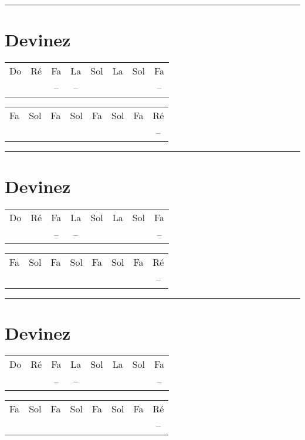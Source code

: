 \documentclass[12pt,a4paper]{article}
\begin{document}
\thispagestyle{empty}

\hrule{}

\section*{Devinez}

\begin{center}
\begin{tabular}{|cccccccc|}
\hline
Do 		& Ré 		& Fa 		& La 		& Sol		& La 		& Sol		& Fa 		\\
\cdot	& \cdot	& --			& --			& \cdot	& \cdot	& \cdot	& --	\\
\hline
\end{tabular}
\begin{tabular}{|cccccccc|}
\hline
Fa 		& Sol 		& Fa 		& Sol 		& Fa		& Sol 		& Fa		& Ré 		\\
\cdot	& \cdot	& \cdot	& \cdot	& \cdot	& \cdot	& \cdot	& --	\\
\hline
\end{tabular}
\end{center}

\hrule{}

\section*{Devinez}

\begin{center}
\begin{tabular}{|cccccccc|}
\hline
Do 		& Ré 		& Fa 		& La 		& Sol		& La 		& Sol		& Fa 		\\
\cdot	& \cdot	& --			& --			& \cdot	& \cdot	& \cdot	& --	\\
\hline
\end{tabular}
\begin{tabular}{|cccccccc|}
\hline
Fa 		& Sol 		& Fa 		& Sol 		& Fa		& Sol 		& Fa		& Ré 		\\
\cdot	& \cdot	& \cdot	& \cdot	& \cdot	& \cdot	& \cdot	& --	\\
\hline
\end{tabular}
\end{center}

\hrule{}

\section*{Devinez}

\begin{center}
\begin{tabular}{|cccccccc|}
\hline
Do 		& Ré 		& Fa 		& La 		& Sol		& La 		& Sol		& Fa 		\\
\cdot	& \cdot	& --			& --			& \cdot	& \cdot	& \cdot	& --	\\
\hline
\end{tabular}
\begin{tabular}{|cccccccc|}
\hline
Fa 		& Sol 		& Fa 		& Sol 		& Fa		& Sol 		& Fa		& Ré 		\\
\cdot	& \cdot	& \cdot	& \cdot	& \cdot	& \cdot	& \cdot	& --	\\
\hline
\end{tabular}
\end{center}
\end{document}
